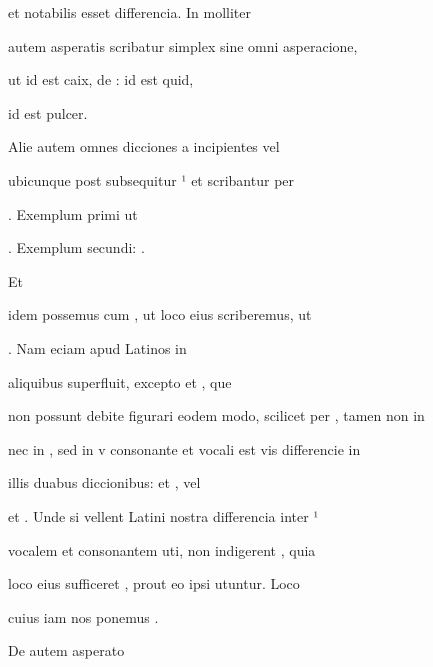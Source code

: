  et  notabilis esset differencia. In molliter

autem asperatis scribatur simplex  sine omni asperacione, 

ut    id est caix, de :  id est quid, 

\splitlines

id est pulcer.

\indentK Alie autem omnes dicciones a  incipientes vel

\fulllines

ubicunque post  subsequitur   ¹ et  scribantur per

. Exemplum primi ut     

\splitlines

. Exemplum secundi:    .

\indentK Et

\fulllines

idem possemus cum , ut loco eius  scriberemus, ut 

  . Nam eciam apud Latinos  in

 aliquibus superfluit, excepto  et , que 

non possunt debite figurari eodem modo, scilicet per , tamen non in 

nec in , sed in v consonante et vocali est vis differencie in

illis duabus diccionibus:  et , vel 

et . Unde si vellent Latini nostra differencia inter ¹

vocalem et  consonantem uti, non indigerent , quia

loco eius sufficeret , prout eo ipsi utuntur. Loco

\splitlines

cuius iam nos ponemus .

\indentK De  autem asperato


